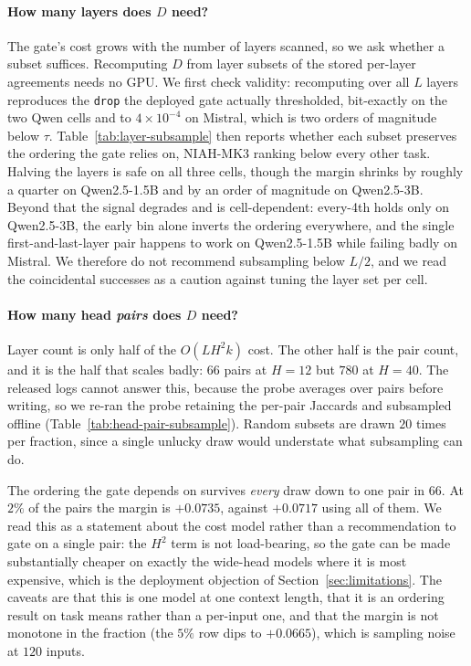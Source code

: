 \paragraph{How many layers does $D$ need?} The gate's cost grows with the
number of layers scanned, so we ask whether a subset suffices. Recomputing $D$
from layer subsets of the stored per-layer agreements needs no GPU. We first
check validity: recomputing over all $L$ layers reproduces the \texttt{drop}
the deployed gate actually thresholded, bit-exactly on the two Qwen cells and
to $4 \times 10^{-4}$ on Mistral, which is two orders of magnitude below
$\tau$. Table~\ref{tab:layer-subsample} then reports whether each subset
preserves the ordering the gate relies on, NIAH-MK3 ranking below every other
task. Halving the layers is safe on all three cells, though the margin shrinks
by roughly a quarter on Qwen2.5-1.5B and by an order of magnitude on
Qwen2.5-3B. Beyond that the signal degrades and is cell-dependent: every-4th
holds only on Qwen2.5-3B, the early bin alone inverts the ordering everywhere,
and the single first-and-last-layer pair happens to work on Qwen2.5-1.5B while
failing badly on Mistral. We therefore do not recommend subsampling below
$L/2$, and we read the coincidental successes as a caution against tuning the
layer set per cell.

\paragraph{How many head \emph{pairs} does $D$ need?}
\label{subsec:head-pair-subsample}
Layer count is only half of the $O(L H^2 k)$ cost. The other half is the
pair count, and it is the half that scales badly: $66$ pairs at $H = 12$
but $780$ at $H = 40$. The released logs cannot answer this, because the
probe averages over pairs before writing, so we re-ran the probe
retaining the per-pair Jaccards and subsampled offline
(Table~\ref{tab:head-pair-subsample}). Random subsets are drawn $20$
times per fraction, since a single unlucky draw would understate what
subsampling can do.

The ordering the gate depends on survives \emph{every} draw down to one pair in
$66$. At $2\%$ of the pairs the margin is $+0.0735$, against $+0.0717$ using all
of them. We read this as a statement about the cost model rather than a
recommendation to gate on a single pair: the $H^2$ term is not load-bearing, so
the gate can be made substantially cheaper on exactly the wide-head models where
it is most expensive, which is the deployment objection of
Section~\ref{sec:limitations}. The caveats are that this is one model at one
context length, that it is an ordering result on task means rather than a
per-input one, and that the margin is not monotone in the fraction (the $5\%$
row dips to $+0.0665$), which is sampling noise at $120$ inputs.

